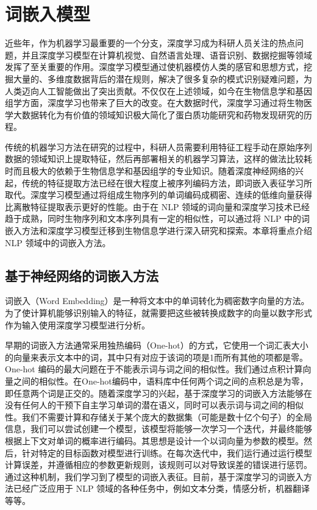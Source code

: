 
\chapter{词嵌入模型}

近些年，作为机器学习最重要的一个分支，深度学习成为科研人员关注的热点问题，并且深度学习模型在计算机视觉、自然语言处理、语音识别、数据挖掘等领域发挥了至关重要的作用。深度学习模型通过使机器模仿人类的感官和思想方式，挖掘大量的、多维度数据背后的潜在规则，解决了很多复杂的模式识别疑难问题，为人类迈向人工智能做出了突出贡献。不仅仅在上述领域，如今在生物信息学和基因组学方面，深度学习也带来了巨大的改变。在大数据时代，深度学习通过将生物医学大数据转化为有价值的领域知识极大简化了蛋白质功能研究和药物发现研究的历程。

传统的机器学习方法在研究的过程中，科研人员需要利用特征工程手动在原始序列数据的领域知识上提取特征，然后再部署相关的机器学习算法，这样的做法比较耗时而且极大的依赖于生物信息学和基因组学的专业知识。随着深度神经网络的兴起，传统的特征提取方法已经在很大程度上被序列编码方法，即词嵌入表征学习所取代。深度学习模型通过将组成生物序列的单词编码成稠密、连续的低维向量获得比离散特征提取表示更好的性能。由于在 NLP 领域的词向量和深度学习技术已经趋于成熟，同时生物序列和文本序列具有一定的相似性，可以通过将 NLP 中的词嵌入方法和深度学习模型迁移到生物信息学进行深入研究和探索。本章将重点介绍 NLP 领域中的词嵌入方法。

\section{基于神经网络的词嵌入方法}
词嵌入（Word Embedding）是一种将文本中的单词转化为稠密数字向量的方法。为了使计算机能够识别输入的特征，就需要把这些被转换成数字的向量以数字形式作为输入使用深度学习模型进行分析。

早期的词嵌入方法通常采用独热编码（One-hot）的方式，它使用一个词汇表大小的向量来表示文本中的词，其中只有对应于该词的项是1而所有其他的项都是零。One-hot 编码的最大问题在于不能表示词与词之间的相似性。我们通过点积计算向量之间的相似性。在One-hot编码中，语料库中任何两个词之间的点积总是为零，即任意两个词是正交的。随着深度学习的兴起，基于深度学习的词嵌入方法能够在没有任何人的干预下自主学习单词的潜在语义，同时可以表示词与词之间的相似性。我们不需要计算和存储关于某个庞大的数据集（可能是数十亿个句子）的全局信息，我们可以尝试创建一个模型，该模型将能够一次学习一个迭代，并最终能够根据上下文对单词的概率进行编码。其思想是设计一个以词向量为参数的模型。然后，针对特定的目标函数对模型进行训练。在每次迭代中，我们运行通过运行模型计算误差，并遵循相应的参数更新规则，该规则可以对导致误差的错误进行惩罚。通过这种机制，我们学习到了模型的词嵌入表征。目前，基于深度学习的词嵌入方法已经广泛应用于 NLP 领域的各种任务中，例如文本分类，情感分析，机器翻译等等。

